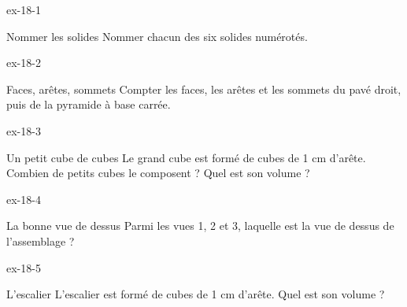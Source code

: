 \clearpage{}
\begin{blocLivre}{ex-18-1}\begin{exercice}[1]{Nommer les solides}
Nommer chacun des six solides numérotés.
\label{fig-ex-18-1}
\end{exercice}\end{blocLivre}
\begin{blocLivre}{ex-18-2}\begin{exercice}[1]{Faces, arêtes, sommets}
Compter les faces, les arêtes et les sommets du pavé droit, puis de la pyramide à base carrée.
\label{fig-ex-18-2}
\end{exercice}\end{blocLivre}
\begin{blocLivre}{ex-18-3}\begin{exercice}[1]{Un petit cube de cubes}
Le grand cube est formé de cubes de 1 cm d’arête. Combien de petits cubes le composent ? Quel est son volume ?
\label{fig-ex-18-3}
\end{exercice}\end{blocLivre}
\begin{blocLivre}{ex-18-4}\begin{exercice}[1]{La bonne vue de dessus}
Parmi les vues 1, 2 et 3, laquelle est la vue de dessus de l’assemblage ?
\label{fig-ex-18-4}
\end{exercice}\end{blocLivre}
\begin{blocLivre}{ex-18-5}\begin{exercice}[1]{L’escalier}
L’escalier est formé de cubes de 1 cm d’arête. Quel est son volume ?
\label{fig-ex-18-5}
\end{exercice}\end{blocLivre}

